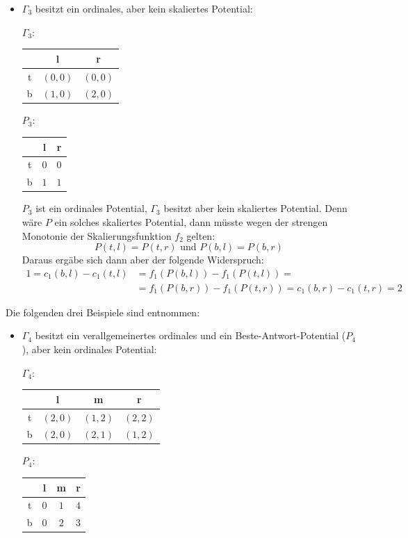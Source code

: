 \begin{bsp}
\begin{itemize}
		\item $\Gamma_3$ besitzt ein ordinales, aber kein skaliertes Potential:
			\begin{center}
				$\Gamma_3:$ \quad
				\begin{tabular}{c||c|c}
					& l 		& r 		\\\hline\hline
					t	& $(0,0)$	& $(0,0)$	\\\hline
					b	& $(1,0)$	& $(2,0)$ 
				\end{tabular}\hspace{5em}
				$P_3:$ \quad
				\begin{tabular}{c||c|c}
					& l 		& r 		\\\hline\hline
					t	& $0$	& $0$	\\\hline
					b	& $1$	& $1$ 
				\end{tabular}
			\end{center}
			$P_3$ ist ein ordinales Potential, $\Gamma_3$ besitzt aber kein skaliertes Potential. Denn wäre $P$ ein solches skaliertes Potential, dann müsste wegen der strengen Monotonie der Skalierungsfunktion $f_2$ gelten:
				\[P(t,l) = P(t,r) \text{ und } P(b,l) = P(b,r)\]
			Daraus ergäbe sich dann aber der folgende Widerspruch:
				\begin{align*}
					1 = c_1(b,l)-c_1(t,l) 	&= f_1(P(b,l)) - f_1(P(t,l)) = \\
											&= f_1(P(b,r)) - f_1(P(t,r)) = c_1(b,r) - c_1(t,r) = 2
				\end{align*}
	\end{itemize}
	Die folgenden drei Beispiele sind \cite[Beispiele 4.1, 4.2 und 4.3]{BestRespPot} entnommen:
	\begin{itemize}
		\item $\Gamma_4$ besitzt ein verallgemeinertes ordinales und ein Beste-Antwort-Potential ($P_4$), aber kein ordinales Potential:
			\begin{center}
				$\Gamma_4:$ \quad
				\begin{tabular}{c||c|c|c}
						& l 		& m			& r 		\\\hline\hline
					t	& $(2,0)$	& $(1,2)$	& $(2,2)$	\\\hline
					b	& $(2,0)$	& $(2,1)$ 	& $(1,2)$
				\end{tabular}\hspace{5em}
				$P_4:$ \quad
				\begin{tabular}{c||c|c|c}
						& l 		& m 		& r \\\hline\hline
					t	& $0$	& $1$		& $4$	\\\hline
					b	& $0$	& $2$ 		& $3$

\end{tabular}
\end{center}
\end{itemize}
\end{bsp}
